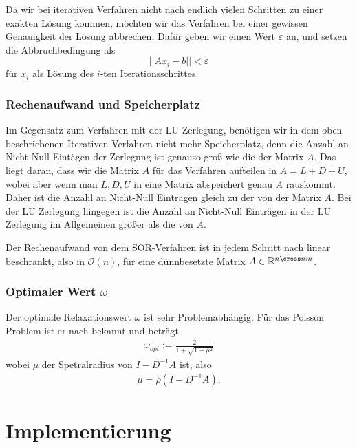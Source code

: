 \documentclass[smallheadings]{scrartcl}
\theoremstyle{definition}
\begin{document}
			
			
			Da wir bei iterativen Verfahren nicht nach endlich vielen Schritten zu einer
			exakten Lösung kommen,  möchten wir das Verfahren bei einer gewissen
			Genauigkeit der Lösung abbrechen.  Dafür geben wir einen Wert $\varepsilon$ 
			an, und setzen die Abbruchbedingung als $$||Ax_i-b||<\varepsilon$$ für $x_i$ 
			als Lösung des $i$-ten Iterationsschrittes.  
			
		\subsubsection{Rechenaufwand und Speicherplatz}	
		
		Im Gegensatz zum Verfahren mit der 
		LU-Zerlegung,  benötigen wir in dem oben beschriebenen Iterativen Verfahren 
		nicht mehr Speicherplatz, denn die Anzahl an Nicht-Null Eintägen der Zerlegung 
		ist genauso groß wie die der Matrix $A$. Das liegt daran, dass wir die Matrix $A$ für das Verfahren aufteilen in $A=L+D+U$, wobei aber wenn man $L,D,U$ in eine Matrix abspeichert genau $A$ rauskommt. Daher ist die Anzahl an Nicht-Null Einträgen gleich zu der von der Matrix $A$. Bei der LU Zerlegung hingegen ist die Anzahl an Nicht-Null Einträgen in der LU Zerlegung im Allgemeinen größer als die von $A$.
		
		Der Rechenaufwand von dem SOR-Verfahren ist in jedem Schritt nach
		 \citep{slides} linear beschränkt, also in $\mathcal{O}(n)$, für eine 
		 dünnbesetzte Matrix $A\in\mathbb{R}^{n\cross nm}$.  
		 
		 \subsubsection{Optimaler Wert $\omega$}
		 Der optimale Relaxationswert $\omega$ ist sehr Problemabhängig. Für das Poisson Problem ist er nach \citep{slides} bekannt und beträgt
		 \begin{align*}
		 \omega _{opt}:=\frac{2}{1+\sqrt{1-\mu ^2}}
		 \end{align*}
		 wobei $\mu$ der Spetralradius von $I-D^{-1}A$ ist, also 
		 \begin{align*}
		 \mu = \rho (I-D^{-1}A).
		 \end{align*}
		 
		 
		
\section{Implementierung}
\end{document}
